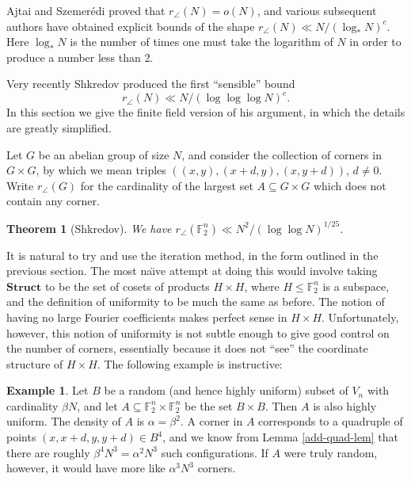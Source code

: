 \documentclass[12pt,a4paper,reqno]{amsart}
\numberwithin{equation}{section}
\theoremstyle{plain}
\newtheorem{theorem}[subsection]{Theorem}
\theoremstyle{definition}
\newtheorem{example}[subsection]{Example}
\renewcommand{\leq}{\leqslant}
\begin{document}
\noindent Ajtai and Szemer\'edi \cite{ajtai-szemeredi} proved that $r_{\angle}(N) = o(N)$, and various subsequent authors \cite{solymosi,vu} have obtained explicit bounds of the shape $r_{\angle}(N) \ll N/(\log_* N)^c$. Here $\log_* N$ is the number of times one must take the logarithm of $N$ in order to produce a number less than 2. \vspace{11pt}

\noindent Very recently Shkredov \cite{shkredov} produced the first ``sensible'' bound \[ r_{\angle}(N) \ll N/(\log \log \log N)^c.\]  In this section we give the finite field version of his argument, in which the details are greatly simplified.\vspace{11pt}

\noindent Let $G$ be an abelian group of size $N$, and consider the collection of corners in $G \times G$, by which we mean triples $((x,y), (x+d,y), (x,y+d))$, $d \neq 0$. Write $r_{\angle}(G)$ for the cardinality of the largest set $A \subseteq G \times G$ which does not contain any corner.

\begin{theorem}[Shkredov] \label{shkredov-thm}We have $r_{\angle}(\mathbb{F}_2^n) \ll N^2/(\log \log N)^{1/25}$.
\end{theorem}

\noindent It is natural to try and use the iteration method, in the form outlined in the previous section. The most na\"{\i}ve attempt at doing this would involve taking $\mathbf{Struct}$ to be the set of cosets of products $H \times H$, where $H \leq \mathbb{F}_2^n$ is a subspace, and the definition of uniformity to be much the same as before. The notion of having no large Fourier coefficients makes perfect sense in $H \times H$. Unfortunately, however, this notion of uniformity is not subtle enough to give good control on the number of corners, essentially because it does not ``see'' the coordinate structure of $H \times H$. The following example is instructive:

\begin{example}\label{ex1}
Let $B$ be a random (and hence highly uniform) subset of $V_n$ with cardinality $\beta N$, and let $A \subseteq \mathbb{F}_2^n \times \mathbb{F}_2^n$ be the set $B \times B$. Then $A$ is also highly uniform. The density of $A$ is $\alpha = \beta^2$. A corner in $A$ corresponds to a quadruple of points $(x,x+d,y,y+d) \in B^4$, and we know from Lemma \ref{add-quad-lem} that there are roughly $\beta^4 N^3 = \alpha^2 N^3$ such configurations. If $A$ were truly random, however, it would have more like $\alpha^3 N^3$ corners.
\end{example}
\end{document}
